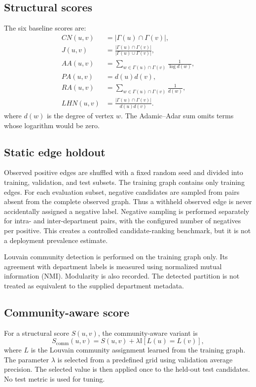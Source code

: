 \documentclass[11pt,a4paper]{article}
\begin{document}
\subsection{Structural scores}
The six baseline scores are:
\begin{align}
CN(u,v)&=|\Gamma(u)\cap\Gamma(v)|,\\
J(u,v)&=\frac{|\Gamma(u)\cap\Gamma(v)|}{|\Gamma(u)\cup\Gamma(v)|},\\
AA(u,v)&=\sum_{w\in\Gamma(u)\cap\Gamma(v)}\frac{1}{\log d(w)},\\
PA(u,v)&=d(u)d(v),\\
RA(u,v)&=\sum_{w\in\Gamma(u)\cap\Gamma(v)}\frac{1}{d(w)},\\
LHN(u,v)&=\frac{|\Gamma(u)\cap\Gamma(v)|}{d(u)d(v)}.
\end{align}
where $d(w)$ is the degree of vertex $w$. The Adamic--Adar sum omits terms whose logarithm would be zero.

\subsection{Static edge holdout}
Observed positive edges are shuffled with a fixed random seed and divided into training, validation, and test subsets. The training graph contains only training edges. For each evaluation subset, negative candidates are sampled from pairs absent from the complete observed graph. Thus a withheld observed edge is never accidentally assigned a negative label. Negative sampling is performed separately for intra- and inter-department pairs, with the configured number of negatives per positive. This creates a controlled candidate-ranking benchmark, but it is not a deployment prevalence estimate.

Louvain community detection is performed on the training graph only. Its agreement with department labels is measured using normalized mutual information (NMI). Modularity is also recorded. The detected partition is not treated as equivalent to the supplied department metadata.

\subsection{Community-aware score}
For a structural score $S(u,v)$, the community-aware variant is
\begin{equation}
S_{\mathrm{comm}}(u,v)=S(u,v)+\lambda\mathbb{I}[L(u)=L(v)],
\end{equation}
where $L$ is the Louvain community assignment learned from the training graph. The parameter $\lambda$ is selected from a predefined grid using validation average precision. The selected value is then applied once to the held-out test candidates. No test metric is used for tuning.
\end{document}

